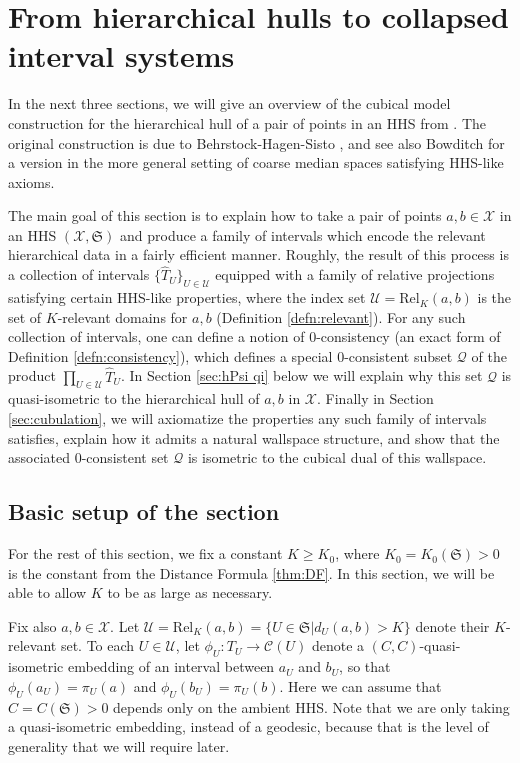 \documentclass{amsart}
\theoremstyle{definition}
\theoremstyle{remark}
\theoremstyle{definition}
\newcommand{\calC}{\mathcal{C}}
\newcommand{\calQ}{\mathcal{Q}}
\newcommand{\calU}{\mathcal{U}}
\newcommand{\calX}{\mathcal{X}}
\newcommand{\hT}{\widehat{T}}
\newcommand{\Rel}{\mathrm{Rel}}
\begin{document}
\section{From hierarchical hulls to collapsed interval systems} \label{sec:interval systems}

In the next three sections, we will give an overview of the cubical model construction for the hierarchical hull of a pair of points in an HHS from \cite{Dur_infcube}.  The original construction is due to Behrstock-Hagen-Sisto \cite{HHS_quasi}, and see also Bowditch \cite{Bowditch_hulls} for a version in the more general setting of coarse median spaces satisfying HHS-like axioms.

The main goal of this section is to explain how to take a pair of points $a,b \in \calX$ in an HHS $(\calX, \mathfrak S)$ and produce a family of intervals which encode the relevant hierarchical data in a fairly efficient manner.  Roughly, the result of this process is a collection of intervals $\{\hT_U\}_{U \in \calU}$ equipped with a family of relative projections satisfying certain HHS-like properties, where the index set $\calU = \Rel_K(a,b)$ is the set of $K$-relevant domains for $a,b$ (Definition \ref{defn:relevant}).  For any such collection of intervals, one can define a notion of $0$-consistency (an exact form of Definition \ref{defn:consistency}), which defines a special $0$-consistent subset $\calQ$ of the product $\prod_{U \in \calU} \hT_U$.  In Section \ref{sec:hPsi qi} below we will explain why this set $\calQ$ is quasi-isometric to the hierarchical hull of $a,b$ in $\calX$.  Finally in Section \ref{sec:cubulation}, we will axiomatize the properties any such family of intervals satisfies, explain how it admits a natural wallspace structure, and show that the associated $0$-consistent set $\calQ$ is isometric to the cubical dual of this wallspace. 


\subsection{Basic setup of the section}

For the rest of this section, we fix a constant $K\geq K_0$, where $K_0 = K_0(\mathfrak S)>0$ is the constant from the Distance Formula \ref{thm:DF}.  In this section, we will be able to allow $K$ to be as large as necessary.

Fix also $a, b\in \calX$.  Let $\calU = \Rel_K(a,b) = \{U \in \mathfrak S| d_U(a,b)>K\}$ denote their $K$-relevant set.  To each $U \in \calU$, let $\phi_U:T_U\to \calC(U)$ denote a $(C,C)$-quasi-isometric embedding of an interval between $a_U$ and $b_U$, so that $\phi_U(a_U) = \pi_U(a)$ and $\phi_U(b_U) = \pi_U(b)$.  Here we can assume that $C=C(\mathfrak S)>0$ depends only on the ambient HHS.  Note that we are only taking a quasi-isometric embedding, instead of a geodesic, because that is the level of generality that we will require later.
\end{document}
